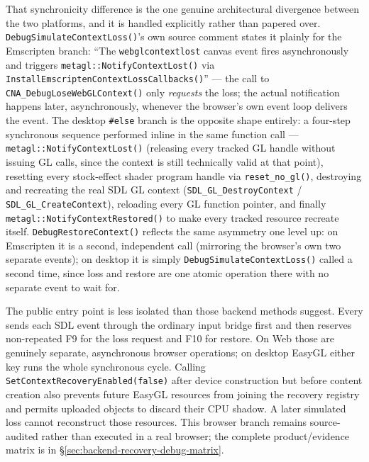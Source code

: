 That synchronicity difference is the one genuine architectural divergence between the two
platforms, and it is handled explicitly rather than papered over. \texttt{DebugSimulateContextLoss()}'s
own source comment states it plainly for the Emscripten branch: ``The \texttt{webglcontextlost}
canvas event fires asynchronously and triggers \texttt{metagl::NotifyContextLost()} via
\texttt{InstallEmscripten\allowbreak{}ContextLoss\allowbreak{}Callbacks()}'' --- the call to
\texttt{CNA\_DebugLoseWebGLContext()} only \emph{requests} the loss; the actual
 notification happens later, asynchronously, whenever the browser's
own event loop delivers the event. The desktop \texttt{\#else} branch is the opposite shape
entirely: a four-step synchronous sequence performed inline in the same function call ---
\texttt{metagl::NotifyContextLost()} (releasing every tracked GL handle without issuing GL
calls, since the context is still technically valid at that point), resetting every stock-effect
shader program handle via \texttt{reset\_no\_gl()}, destroying and recreating the real SDL GL
context (\texttt{SDL\_GL\_DestroyContext} / \texttt{SDL\_GL\_CreateContext}), reloading every GL
function pointer, and finally \texttt{metagl::NotifyContextRestored()} to make every tracked
resource recreate itself. \texttt{DebugRestoreContext()} reflects the same asymmetry one level
up: on Emscripten it is a second, independent call (mirroring the browser's own two separate
events); on desktop it is simply \texttt{DebugSimulateContextLoss()} called a second time,
since loss and restore are one atomic operation there with no separate event to wait for.

The public entry point is less isolated than those backend methods suggest. Every
 sends each SDL event through the ordinary input bridge first and then reserves
non-repeated F9 for the loss request and F10 for restore. On Web those are genuinely separate,
asynchronous browser operations; on desktop EasyGL either key runs the whole synchronous
cycle. Calling \texttt{SetContextRecoveryEnabled(false)} after device construction but before
content creation also prevents future EasyGL resources from joining the recovery registry
and permits uploaded  objects to discard their CPU shadow. A later
simulated loss cannot reconstruct those resources. This browser branch remains source-audited
rather than executed in a real browser; the complete product/evidence matrix is in
\S\ref{sec:backend-recovery-debug-matrix}.

